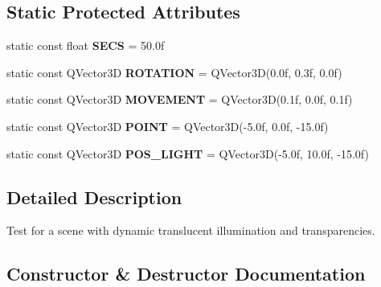 \subsection*{Static Protected Attributes}
\begin{DoxyCompactItemize}
\item 
\mbox{\label{class_unit_test_1_1_c_translucent_shadowing_test_a3c6db73bed1795598dcec4a0d1f7a616}} 
static const float {\bfseries S\+E\+CS} = 50.\+0f
\item 
\mbox{\label{class_unit_test_1_1_c_translucent_shadowing_test_a5b12e85d53f6413eeabb70f0aa23d017}} 
static const Q\+Vector3D {\bfseries R\+O\+T\+A\+T\+I\+ON} = Q\+Vector3D(0.\+0f, 0.\+3f, 0.\+0f)
\item 
\mbox{\label{class_unit_test_1_1_c_translucent_shadowing_test_aadf508353dd493503af97700b95eccf0}} 
static const Q\+Vector3D {\bfseries M\+O\+V\+E\+M\+E\+NT} = Q\+Vector3D(0.\+1f, 0.\+0f, 0.\+1f)
\item 
\mbox{\label{class_unit_test_1_1_c_translucent_shadowing_test_a01fb6c0f7a79af7ca28c6162c18c7fae}} 
static const Q\+Vector3D {\bfseries P\+O\+I\+NT} = Q\+Vector3D(-\/5.\+0f, 0.\+0f, -\/15.\+0f)
\item 
\mbox{\label{class_unit_test_1_1_c_translucent_shadowing_test_a8d11e373ff78746caead82b12f5bb949}} 
static const Q\+Vector3D {\bfseries P\+O\+S\+\_\+\+L\+I\+G\+HT} = Q\+Vector3D(-\/5.\+0f, 10.\+0f, -\/15.\+0f)
\end{DoxyCompactItemize}


\subsection{Detailed Description}
Test for a scene with dynamic translucent illumination and transparencies. 

\subsection{Constructor \& Destructor Documentation}
\mbox{\label{class_unit_test_1_1_c_translucent_shadowing_test_ac2abacd427b29b315eea6d4e95ec2852}} 
